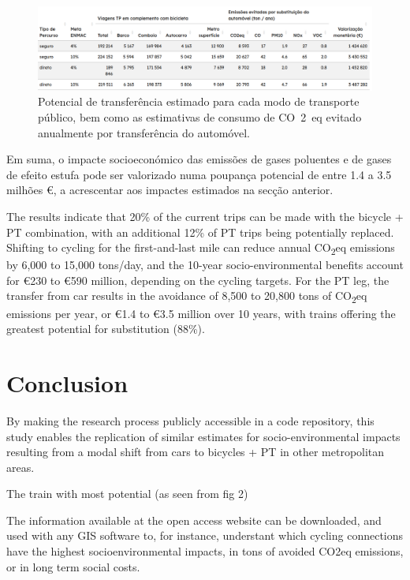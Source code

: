 \documentclass[runningheads]{llncs}
\begin{document}
\begin{figure}
\includegraphics[width=1\linewidth,]{img/table2} \caption{Potencial de transferência estimado para cada modo de transporte público, bem como as estimativas de consumo de CO~2~eq evitado anualmente por transferência do automóvel.}\label{fig:summary2}
\end{figure}

Em suma, o impacte socioeconómico das emissões de gases poluentes e de
gases de efeito estufa pode ser valorizado numa poupança potencial de
entre 1.4 a 3.5 milhões €, a acrescentar aos impactes estimados na
secção anterior.

The results indicate that 20\% of the current trips can be made with the
bicycle + PT combination, with an additional 12\% of PT trips being
potentially replaced. Shifting to cycling for the first-and-last mile
can reduce annual CO\textsubscript{2}eq emissions by 6,000 to 15,000
tons/day, and the 10-year socio-environmental benefits account for €230
to €590 million, depending on the cycling targets. For the PT leg, the
transfer from car results in the avoidance of 8,500 to 20,800 tons of
CO\textsubscript{2}eq emissions per year, or €1.4 to €3.5 million over
10 years, with trains offering the greatest potential for substitution
(88\%).

\hypertarget{conclusion}{%
\section{Conclusion}\label{conclusion}}

By making the research process publicly accessible in a code repository,
this study enables the replication of similar estimates for
socio-environmental impacts resulting from a modal shift from cars to
bicycles + PT in other metropolitan areas.

The train with most potential (as seen from fig 2)

The information available at the open access website can be downloaded,
and used with any GIS software to, for instance, understant which
cycling connections have the highest socioenvironmental impacts, in tons
of avoided CO2eq emissions, or in long term social costs.
\end{document}
